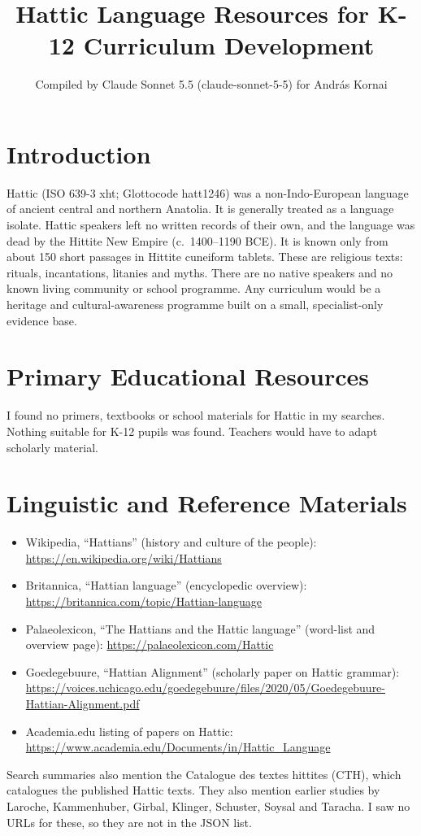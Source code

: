 \documentclass[12pt]{article}
\title{Hattic Language Resources for K-12 Curriculum Development}
\author{Compiled by Claude Sonnet 5.5 (claude-sonnet-5-5) for Andr\'as Kornai}
\date{}
\begin{document}
\maketitle

\section{Introduction}
Hattic (ISO 639-3 xht; Glottocode hatt1246) was a non-Indo-European language of ancient central and northern Anatolia. It is generally treated as a language isolate. Hattic speakers left no written records of their own, and the language was dead by the Hittite New Empire (c.\ 1400--1190 BCE). It is known only from about 150 short passages in Hittite cuneiform tablets. These are religious texts: rituals, incantations, litanies and myths. There are no native speakers and no known living community or school programme. Any curriculum would be a heritage and cultural-awareness programme built on a small, specialist-only evidence base.

\section{Primary Educational Resources}
I found no primers, textbooks or school materials for Hattic in my searches. Nothing suitable for K-12 pupils was found. Teachers would have to adapt scholarly material.

\section{Linguistic and Reference Materials}
\begin{itemize}
\item Wikipedia, ``Hattians'' (history and culture of the people): \url{https://en.wikipedia.org/wiki/Hattians}
\item Britannica, ``Hattian language'' (encyclopedic overview): \url{https://britannica.com/topic/Hattian-language}
\item Palaeolexicon, ``The Hattians and the Hattic language'' (word-list and overview page): \url{https://palaeolexicon.com/Hattic}
\item Goedegebuure, ``Hattian Alignment'' (scholarly paper on Hattic grammar): \url{https://voices.uchicago.edu/goedegebuure/files/2020/05/Goedegebuure-Hattian-Alignment.pdf}
\item Academia.edu listing of papers on Hattic: \url{https://www.academia.edu/Documents/in/Hattic_Language}
\end{itemize}
Search summaries also mention the Catalogue des textes hittites (CTH), which catalogues the published Hattic texts. They also mention earlier studies by Laroche, Kammenhuber, Girbal, Klinger, Schuster, Soysal and Taracha. I saw no URLs for these, so they are not in the JSON list.
\end{document}
